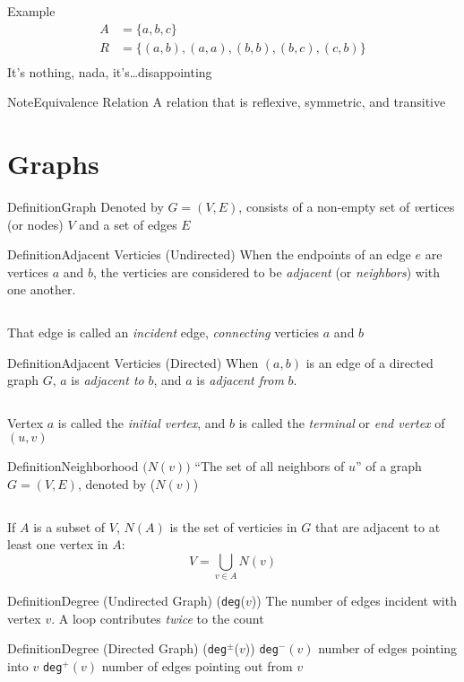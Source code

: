 \documentclass{MathNotes}
\newenvironment{example}[1]{\begin{BlueBox}{Example}{#1}}{\end{BlueBox}}
\newenvironment{definition}[1]{\begin{RedBox}{Definition}{#1}}{\end{RedBox}}
\newenvironment{note}[1]{\begin{YellowBox}{Note}{#1}}{\end{YellowBox}}
\newcommand{\bl}{
	\newline$ $\newline
}
\begin{document}
\begin{example}{}
	\begin{align*}
		A & = \{a,b,c\}                         \\
		R & = \{(a,b),(a,a),(b,b),(b,c),(c,b)\} \\
	\end{align*}
	It's nothing, nada, it's\ldots disappointing
\end{example}

\begin{note}{Equivalence Relation}
	A relation that is reflexive, symmetric, and transitive
\end{note}

\newpage
\section{Graphs}
\begin{definition}{Graph}
	Denoted by $G=(V,E)$, consists of a non-empty set of \textit vertices (or nodes) $V$ and a set of edges $E$
\end{definition}
\begin{multicols}{2}
	\begin{definition}{Adjacent Verticies (Undirected)}
		When the endpoints of an edge $e$ are vertices $a$ and $b$, the verticies
		are considered to be \textit{adjacent} (or \textit{neighbors}) with one
		another.
		\bl
		That edge is called an \textit{incident} edge, \textit{connecting} verticies
		$a$ and $b$
	\end{definition}
	\begin{definition}{Adjacent Verticies (Directed)}
		When $(a,b)$ is an edge of a directed graph $G$, $a$ is \textit{adjacent to}
		$b$, and $a$ is \textit{adjacent from} $b$.
		\bl
		Vertex $a$ is called the \textit{initial vertex}, and $b$ is called
		the \textit{terminal} or \textit{end vertex} of $(u,v)$
	\end{definition}
\end{multicols}

\begin{definition}{Neighborhood $\big(N(v)\big)$}
	``The set of all neighbors of $u$'' of a graph $G=(V,E)$, denoted by ($N(v)$)
	\bl
	If $A$ is a subset of $V$, $N(A)$ is the set of verticies in $G$ that are
	adjacent to at least one vertex in $A$: \[V=\bigcup_{v\in A}N(v)\]
\end{definition}

\begin{multicols}{2}
	\begin{definition}{Degree (Undirected Graph) \big(\texttt{deg}($v$)\big)}
		The number of edges incident with vertex $v$. A loop contributes
		\textit{twice} to the count
	\end{definition}
	\begin{definition}{Degree (Directed Graph) \big(\texttt{deg}$^{\pm}$($v$)\big)}
		\texttt{deg}$^-(v)$ number of edges pointing into $v$
		\newline
		\texttt{deg}$^+(v)$ number of edges pointing out from $v$
	\end{definition}
\end{multicols}
\end{document}
